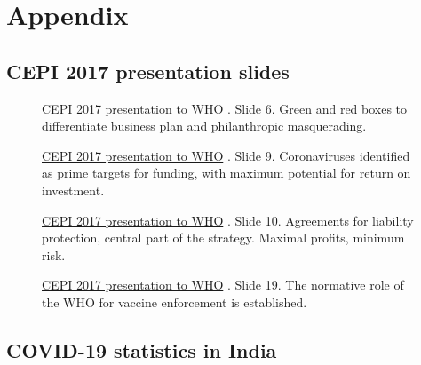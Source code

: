 \documentclass[11pt,a4paper,notitlepage]{report}
\begin{document}
\section*{Appendix}

\subsection*{CEPI 2017 presentation slides}

\begin{figure}[h]
    \centering
    \caption{\href{https://www.who.int/medicines/ebola-treatment/TheCoalitionEpidemicPreparednessInnovations-an-overview.pdf}{CEPI 2017 presentation to WHO} \cite{cepi072017}. Slide 6. Green and red boxes to differentiate business plan and philanthropic masquerading.}
    \label{fig:CEPI-slide-6}
\end{figure}

\begin{figure}[h]
    \centering
    \caption{\href{https://www.who.int/medicines/ebola-treatment/TheCoalitionEpidemicPreparednessInnovations-an-overview.pdf}{CEPI 2017 presentation to WHO} \cite{cepi072017}. Slide 9. Coronaviruses identified as prime targets for funding, with maximum potential for return on investment.}
    \label{fig:CEPI-slide-9}
\end{figure}

\begin{figure}[h]
    \centering
    \caption{\href{https://www.who.int/medicines/ebola-treatment/TheCoalitionEpidemicPreparednessInnovations-an-overview.pdf}{CEPI 2017 presentation to WHO} \cite{cepi072017}. Slide 10. Agreements for liability protection, central part of the strategy. Maximal profits, minimum risk.}
    \label{fig:CEPI-slide-10}
\end{figure}

\begin{figure}[h]
    \centering
    \caption{\href{https://www.who.int/medicines/ebola-treatment/TheCoalitionEpidemicPreparednessInnovations-an-overview.pdf}{CEPI 2017 presentation to WHO} \cite{cepi072017}. Slide 19. The normative role of the WHO for vaccine enforcement is established.}
    \label{fig:CEPI-slide-19}
\end{figure}

\clearpage

\subsection*{COVID-19 statistics in India}
\end{document}
